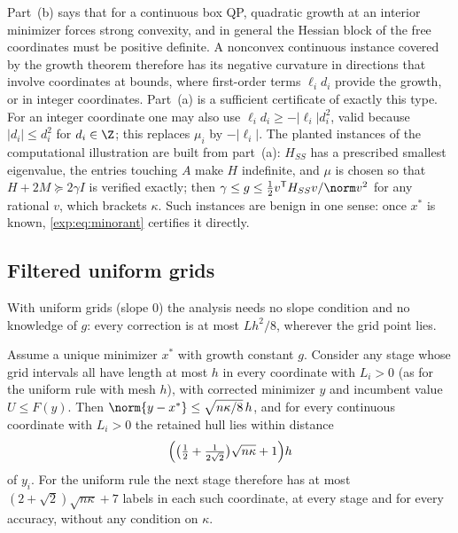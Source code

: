 \begin{remark}\label{exp:rem:nonconvex}
Part~(b) says that for a continuous box QP, quadratic growth at an interior
minimizer forces strong convexity, and in general the Hessian block of the
free coordinates must be positive definite. A nonconvex continuous instance
covered by the growth theorem therefore has its negative curvature in
directions that involve coordinates at bounds, where first-order terms
$\ell_id_i$ provide the growth, or in integer coordinates. Part~(a) is a
sufficient certificate of exactly this type. For an integer coordinate one
may also use $\ell_id_i\ge-|\ell_i|d_i^2$, valid because $|d_i|\le d_i^2$
for $d_i\in\Z$; this replaces $\mu_i$ by $-|\ell_i|$. The planted instances of
the computational illustration are built from part~(a): $H_{SS}$ has a
prescribed smallest eigenvalue, the entries touching $A$ make $H$ indefinite,
and $\mu$ is chosen so that $H+2M\succeq2\gamma I$ is verified exactly; then
$\gamma\le g\le\frac12v^{\mathsf T}H_{SS}v/\norm v^2$ for any rational $v$,
which brackets $\kappa$. Such instances are benign in one sense: once $x^*$
is known, \eqref{exp:eq:minorant} certifies it directly.
\end{remark}

\subsection{Filtered uniform grids}

With uniform grids (slope $0$) the analysis needs no slope condition and no
knowledge of $g$: every correction is at most $Lh^2/8$, wherever the grid
point lies.

\begin{proposition}\label{exp:prop:uniform}
Assume a unique minimizer $x^*$ with growth constant $g$. Consider any stage
whose grid intervals all have length at most $h$ in every coordinate with
$L_i>0$ (as for the uniform rule with mesh $h$), with corrected minimizer $y$
and incumbent value $U\le F(y)$. Then
$\norm{y-x^*}\le\sqrt{n\kappa/8}\,h$, and for every continuous coordinate
with $L_i>0$ the retained hull lies within distance
\[
\Bigl(\bigl(\tfrac12+\tfrac1{2\sqrt2}\bigr)\sqrt{n\kappa}+1\Bigr)h
\]
of $y_i$. For the uniform rule the next stage therefore has at most
$(2+\sqrt2)\sqrt{n\kappa}+7$ labels in each such coordinate, at every
stage and for every accuracy, without any condition on $\kappa$.
\end{proposition}

